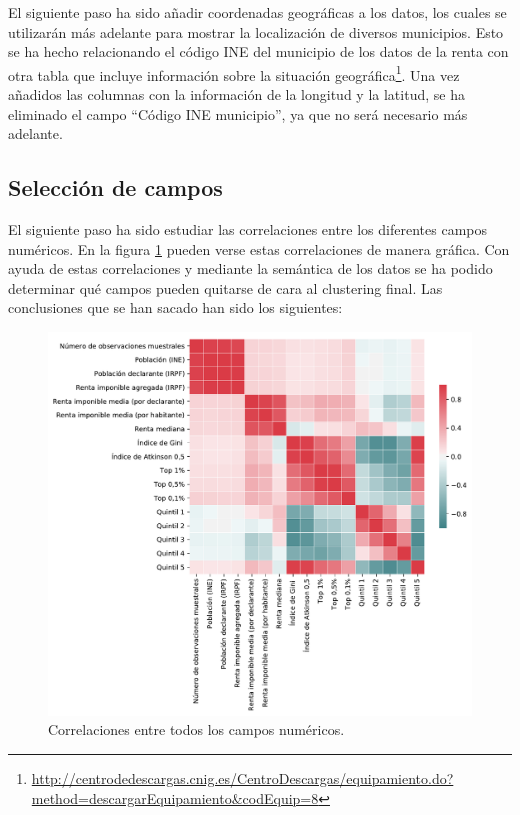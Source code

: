 \documentclass[acmtog, screen]{acmart}
\begin{document}
El siguiente paso ha sido añadir coordenadas geográficas a los datos, los cuales se utilizarán más adelante para mostrar la localización de diversos municipios. Esto se ha hecho relacionando el código INE del municipio de los datos de la renta con otra tabla que incluye información sobre la situación geográfica\footnote{\url{http://centrodedescargas.cnig.es/CentroDescargas/equipamiento.do?method=descargarEquipamiento\&codEquip=8}}. Una vez añadidos las columnas con la información de la longitud y la latitud, se ha eliminado el campo ``Código INE municipio'', ya que no será necesario más adelante.

\subsection{Selección de campos}
El siguiente paso ha sido estudiar las correlaciones entre los diferentes campos numéricos. En la figura \ref{fig:correlaciones1} pueden verse estas correlaciones de manera gráfica. Con ayuda de estas correlaciones y mediante la semántica de los datos se ha podido determinar qué campos pueden quitarse de cara al clustering final. Las conclusiones que se han sacado han sido los siguientes:

\begin{figure}
	\centering
	\includegraphics[width=\columnwidth]{Correlaciones1}
	\caption{Correlaciones entre todos los campos numéricos.}
	\label{fig:correlaciones1}
\end{figure}
\end{document}

